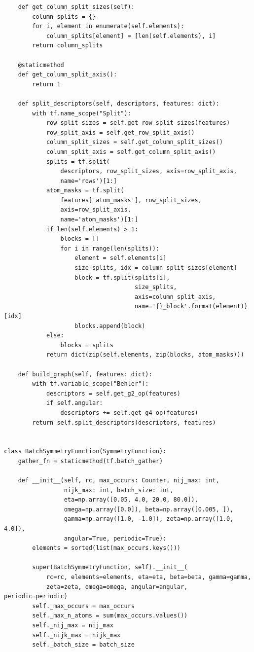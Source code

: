 \documentclass[preprint]{revtex4-2}
\begin{document}
\begin{verbatim}
    def get_column_split_sizes(self):
        column_splits = {}
        for i, element in enumerate(self.elements):
            column_splits[element] = [len(self.elements), i]
        return column_splits

    @staticmethod
    def get_column_split_axis():
        return 1

    def split_descriptors(self, descriptors, features: dict):
        with tf.name_scope("Split"):
            row_split_sizes = self.get_row_split_sizes(features)
            row_split_axis = self.get_row_split_axis()
            column_split_sizes = self.get_column_split_sizes()
            column_split_axis = self.get_column_split_axis()
            splits = tf.split(
                descriptors, row_split_sizes, axis=row_split_axis,
                name='rows')[1:]
            atom_masks = tf.split(
                features['atom_masks'], row_split_sizes, 
                axis=row_split_axis,
                name='atom_masks')[1:]
            if len(self.elements) > 1:
                blocks = []
                for i in range(len(splits)):
                    element = self.elements[i]
                    size_splits, idx = column_split_sizes[element]
                    block = tf.split(splits[i],
                                     size_splits,
                                     axis=column_split_axis,
                                     name='{}_block'.format(element))[idx]
                    blocks.append(block)
            else:
                blocks = splits
            return dict(zip(self.elements, zip(blocks, atom_masks)))

    def build_graph(self, features: dict):
        with tf.variable_scope("Behler"):
            descriptors = self.get_g2_op(features)
            if self.angular:
                descriptors += self.get_g4_op(features)
        return self.split_descriptors(descriptors, features)


class BatchSymmetryFunction(SymmetryFunction):
    gather_fn = staticmethod(tf.batch_gather)

    def __init__(self, rc, max_occurs: Counter, nij_max: int, 
                 nijk_max: int, batch_size: int, 
                 eta=np.array([0.05, 4.0, 20.0, 80.0]),
                 omega=np.array([0.0]), beta=np.array([0.005, ]),
                 gamma=np.array([1.0, -1.0]), zeta=np.array([1.0, 4.0]),
                 angular=True, periodic=True):
        elements = sorted(list(max_occurs.keys()))

        super(BatchSymmetryFunction, self).__init__(
            rc=rc, elements=elements, eta=eta, beta=beta, gamma=gamma,
            zeta=zeta, omega=omega, angular=angular, periodic=periodic)
        self._max_occurs = max_occurs
        self._max_n_atoms = sum(max_occurs.values())
        self._nij_max = nij_max
        self._nijk_max = nijk_max
        self._batch_size = batch_size


\end{verbatim}
\end{document}
